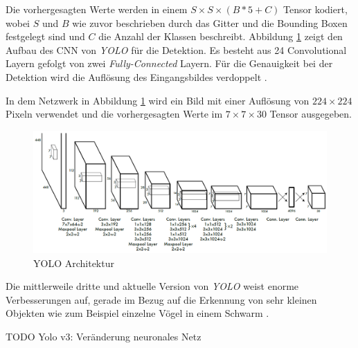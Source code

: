 \newpage

Die vorhergesagten Werte werden in einem $S \times S \times (B * 5 + C)$ Tensor kodiert, wobei $S$ und $B$ wie zuvor beschrieben durch das Gitter und die Bounding Boxen festgelegt sind und $C$ die Anzahl der Klassen beschreibt. Abbildung \ref{yolo_architecture} zeigt den Aufbau des CNN von \textit{YOLO} für die Detektion. Es besteht aus 24 Convolutional Layern gefolgt von zwei \textit{Fully-Connected} Layern. Für die Genauigkeit bei der Detektion wird die Auflösung des Eingangsbildes verdoppelt \cite{JosephRedmon.2016}. 

In dem Netzwerk in Abbildung \ref{yolo_architecture} wird ein Bild mit einer Auflösung von $224 \times 224$ Pixeln verwendet und die vorhergesagten Werte im $7 \times 7 \times 30$ Tensor ausgegeben.

\begin{figure}[ht]
	\begin{center}
		\includegraphics[width=15cm]{Bilder/yolo_architecture.png} 
		\caption[YOLO Architektur]{YOLO Architektur \cite{JosephRedmon.2016}}
		\label{yolo_architecture}
	\end{center}
\end{figure}

Die mittlerweile dritte und aktuelle Version von \textit{YOLO} weist enorme Verbesserungen auf, gerade im Bezug auf die Erkennung von sehr kleinen Objekten wie zum Beispiel einzelne Vögel in einem Schwarm \cite{JosephRedmon.2018}.

TODO Yolo v3: Veränderung neuronales Netz





